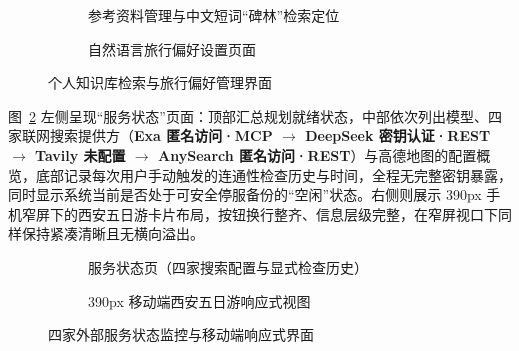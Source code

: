 \begin{figure}[H]
  \centering
  \begin{subfigure}[b]{0.48\textwidth}
    \centering
    \caption{参考资料管理与中文短词“碑林”检索定位}
  \end{subfigure}\hfill
  \begin{subfigure}[b]{0.48\textwidth}
    \centering
    \caption{自然语言旅行偏好设置页面}
  \end{subfigure}
  \caption{个人知识库检索与旅行偏好管理界面}
  \label{fig:ui-knowledge-pref}
\end{figure}

图~\ref{fig:ui-status-mobile} 左侧呈现“服务状态”页面：顶部汇总规划就绪状态，中部依次列出模型、四家联网搜索提供方（\textbf{Exa 匿名访问·MCP $\rightarrow$ DeepSeek 密钥认证·REST $\rightarrow$ Tavily 未配置 $\rightarrow$ AnySearch 匿名访问·REST}）与高德地图的配置概览，底部记录每次用户手动触发的连通性检查历史与时间，全程无完整密钥暴露，同时显示系统当前是否处于可安全停服备份的“空闲”状态。右侧则展示 390px 手机窄屏下的西安五日游卡片布局，按钮换行整齐、信息层级完整，在窄屏视口下同样保持紧凑清晰且无横向溢出。

\begin{figure}[H]
  \centering
  \begin{subfigure}[b]{0.60\textwidth}
    \centering
    \caption{服务状态页（四家搜索配置与显式检查历史）}
  \end{subfigure}\hfill
  \begin{subfigure}[b]{0.36\textwidth}
    \centering
    \caption{390px 移动端西安五日游响应式视图}
  \end{subfigure}
  \caption{四家外部服务状态监控与移动端响应式界面}
  \label{fig:ui-status-mobile}
\end{figure}
